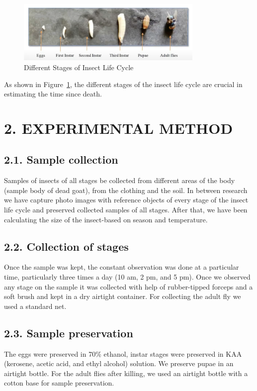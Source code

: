 \documentclass{article}
\begin{document}
\begin{figure}[ht]
    \centering
    \includegraphics[width=0.8\textwidth]{fig01.png}
    \caption{Different Stages of Insect Life Cycle}
    \label{fig:insect-life-cycle}
\end{figure}

As shown in Figure~\ref{fig:insect-life-cycle}, the different stages of the insect life cycle are crucial in estimating the time since death.

\section*{2. EXPERIMENTAL METHOD}
\subsection*{2.1. Sample collection}
Samples of insects of all stages be collected from different areas of the body (sample body of dead goat), from the clothing and the soil. In between research we have capture photo images with reference objects of every stage of the insect life cycle and preserved collected samples of all stages. After that, we have been calculating the size of the insect-based on season and temperature.
\subsection*{2.2. Collection of stages}
Once the sample was kept, the constant observation was done at a particular time, particularly three times a day (10 am, 2 pm, and 5 pm). Once we observed any stage on the sample it was collected with help of rubber-tipped forceps and a soft brush and kept in a dry airtight container. For collecting the adult fly we used a standard net.
\subsection*{2.3. Sample preservation}
The eggs were preserved in 70\% ethanol, instar stages were preserved in KAA (kerosene, acetic acid, and ethyl alcohol) solution. We preserve pupae in an airtight bottle. For the adult flies after killing, we used an airtight bottle with a cotton base for sample preservation.
\end{document}
